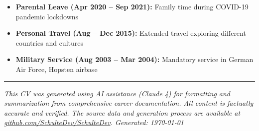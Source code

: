 \documentclass[10pt,a4paper]{article}
\begin{document}
\begin{itemize}[leftmargin=*]
\item \textbf{Parental Leave (Apr 2020 -- Sep 2021):} Family time during COVID-19 pandemic lockdowns
\item \textbf{Personal Travel (Aug -- Dec 2015):} Extended travel exploring different countries and cultures
\item \textbf{Military Service (Aug 2003 -- Mar 2004):} Mandatory service in German Air Force, Hopsten airbase
\end{itemize}

\vfill

\hrule
\vspace{3pt}
{\footnotesize\textit{This CV was generated using AI assistance (Claude 4) for formatting and summarization from comprehensive career documentation. All content is factually accurate and verified. The source data and generation process are available at \href{https://github.com/SchulteDev/SchulteDev}{github.com/SchulteDev/SchulteDev}. Generated: \today}}
\end{document}
